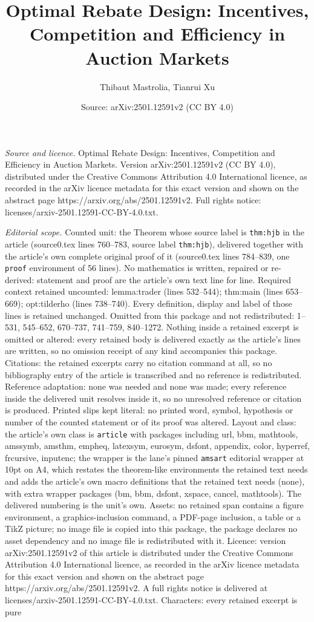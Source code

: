 \documentclass[10pt,a4paper]{amsart}
\title[Optimal Rebate Design: Incentives, Competition and Efficienc]{Optimal Rebate Design: Incentives, Competition and Efficiency in Auction Markets}
\author{Thibaut Mastrolia, Tianrui Xu}
\date{Source: arXiv:2501.12591v2 (CC BY 4.0)}
\begin{document}
\maketitle

\noindent\emph{Source and licence.} Optimal Rebate Design: Incentives, Competition and Efficiency in Auction Markets. Version arXiv:2501.12591v2 (CC BY 4.0), distributed under the Creative Commons Attribution 4.0 International licence, as recorded in the arXiv licence metadata for this exact version and shown on the abstract page https://arxiv.org/abs/2501.12591v2. Full rights notice: licenses/arxiv-2501.12591-CC-BY-4.0.txt.\par\smallskip

\noindent\textit{Editorial scope.} Counted unit: the Theorem whose source label is \texttt{thm:hjb} in the article (source0.tex lines 760--783, source label \texttt{thm:hjb}), delivered together with the article's own complete original proof of it (source0.tex lines 784--839, one \texttt{proof} environment of 56 lines). No mathematics is written, repaired or re-derived: statement and proof are the article's own text line for line. Required context retained uncounted: lemma:trader (lines 532--544); thm:main (lines 653--669); opt:tilderho (lines 738--740). Every definition, display and label of those lines is retained unchanged. Omitted from this package and not redistributed: 1--531, 545--652, 670--737, 741--759, 840--1272. Nothing inside a retained excerpt is omitted or altered: every retained body is delivered exactly as the article's lines are written, so no omission receipt of any kind accompanies this package. Citations: the retained excerpts carry no citation command at all, so no bibliography entry of the article is transcribed and no reference is redistributed. Reference adaptation: none was needed and none was made; every reference inside the delivered unit resolves inside it, so no unresolved reference or citation is produced. Printed slips kept literal: no printed word, symbol, hypothesis or number of the counted statement or of its proof was altered. Layout and class: the article's own class is \texttt{article} with packages including url, bbm, mathtools, amssymb, amsthm, empheq, latexsym, eurosym, dsfont, appendix, color, hyperref, frcursive, inputenc; the wrapper is the lane's pinned \texttt{amsart} editorial wrapper at 10pt on A4, which restates the theorem-like environments the retained text needs and adds the article's own macro definitions that the retained text needs (none), with extra wrapper packages (bm, bbm, dsfont, xspace, cancel, mathtools). The delivered numbering is the unit's own. Assets: no retained span contains a figure environment, a graphics-inclusion command, a PDF-page inclusion, a table or a TikZ picture; no image file is copied into this package, the package declares no asset dependency and no image file is redistributed with it. Licence: version arXiv:2501.12591v2 of this article is distributed under the Creative Commons Attribution 4.0 International licence, as recorded in the arXiv licence metadata for this exact version and shown on the abstract page https://arxiv.org/abs/2501.12591v2. A full rights notice is delivered at licenses/arxiv-2501.12591-CC-BY-4.0.txt. Characters: every retained excerpt is pure 
\end{document}
